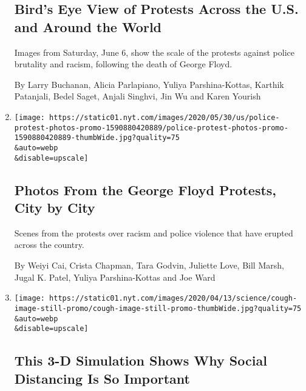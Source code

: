 \begin{enumerate}
  \hypertarget{birds-eye-view-of-protests-across-the-us-and-around-the-world}{%
  \subsection{Bird's Eye View of Protests Across the U.S. and Around the
  World}\label{birds-eye-view-of-protests-across-the-us-and-around-the-world}}

  Images from Saturday, June 6, show the scale of the protests against
  police brutality and racism, following the death of George Floyd.

  By Larry Buchanan, Alicia Parlapiano, Yuliya Parshina-Kottas, Karthik
  Patanjali, Bedel Saget, Anjali Singhvi, Jin Wu and Karen Yourish
\item
  \href{/interactive/2020/05/30/us/george-floyd-protest-photos.html}{}

  \texttt{[image: https://static01.nyt.com/images/2020/05/30/us/police-protest-photos-promo-1590880420889/police-protest-photos-promo-1590880420889-thumbWide.jpg?quality=75\\\&auto=webp\\\&disable=upscale]}

  \hypertarget{photos-from-the-george-floyd-protests-city-by-city}{%
  \subsection{Photos From the George Floyd Protests, City by
  City}\label{photos-from-the-george-floyd-protests-city-by-city}}

  Scenes from the protests over racism and police violence that have
  erupted across the country.

  By Weiyi Cai, Crista Chapman, Tara Godvin, Juliette Love, Bill Marsh,
  Jugal K. Patel, Yuliya Parshina-Kottas and Joe Ward
\item
  \href{/interactive/2020/04/14/science/coronavirus-transmission-cough-6-feet-ar-ul.html}{}

  \texttt{[image: https://static01.nyt.com/images/2020/04/13/science/cough-image-still-promo/cough-image-still-promo-thumbWide.jpg?quality=75\\\&auto=webp\\\&disable=upscale]}

  \hypertarget{this-3-d-simulation-shows-why-social-distancing-is-so-important}{%
  \subsection{This 3-D Simulation Shows Why Social Distancing Is So
  Important}\label{this-3-d-simulation-shows-why-social-distancing-is-so-important}}


\end{enumerate}
